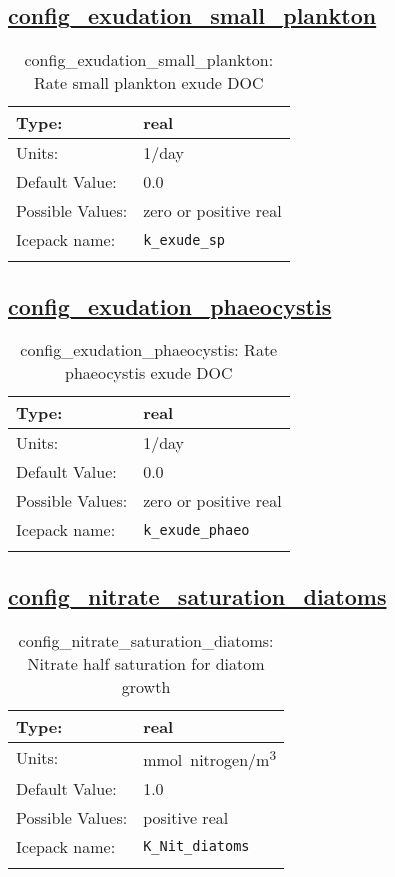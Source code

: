 \subsection[config\_exudation\_small\_plankton]{\hyperref[sec:nm_tab_biogeochemistry]{config\_exudation\_small\_plankton}}
\label{subsec:nm_sec_config_exudation_small_plankton}
\begin{center}
\begin{longtable}{| p{2.0in} || p{4.0in} |}
    \hline
    Type: & real \\
    \hline
    Units: & \si{1/day} \\
    \hline
    Default Value: & 0.0 \\
    \hline
    Possible Values: & zero or positive real \\
    \hline
    Icepack name: & \verb+k_exude_sp+ \\
    \hline
    \caption{config\_exudation\_small\_plankton: Rate small plankton exude DOC}
\end{longtable}
\end{center}
\subsection[config\_exudation\_phaeocystis]{\hyperref[sec:nm_tab_biogeochemistry]{config\_exudation\_phaeocystis}}
\label{subsec:nm_sec_config_exudation_phaeocystis}
\begin{center}
\begin{longtable}{| p{2.0in} || p{4.0in} |}
    \hline
    Type: & real \\
    \hline
    Units: & \si{1/day} \\
    \hline
    Default Value: & 0.0 \\
    \hline
    Possible Values: & zero or positive real \\
    \hline
    Icepack name: & \verb+k_exude_phaeo+ \\
    \hline
    \caption{config\_exudation\_phaeocystis: Rate phaeocystis exude DOC}
\end{longtable}
\end{center}
\subsection[config\_nitrate\_saturation\_diatoms]{\hyperref[sec:nm_tab_biogeochemistry]{config\_nitrate\_saturation\_diatoms}}
\label{subsec:nm_sec_config_nitrate_saturation_diatoms}
\begin{center}
\begin{longtable}{| p{2.0in} || p{4.0in} |}
    \hline
    Type: & real \\
    \hline
    Units: & \si{mmol.nitrogen/m^3} \\
    \hline
    Default Value: & 1.0 \\
    \hline
    Possible Values: & positive real \\
    \hline
    Icepack name: & \verb+K_Nit_diatoms+ \\
    \hline
    \caption{config\_nitrate\_saturation\_diatoms: Nitrate half saturation for diatom growth}
\end{longtable}
\end{center}
